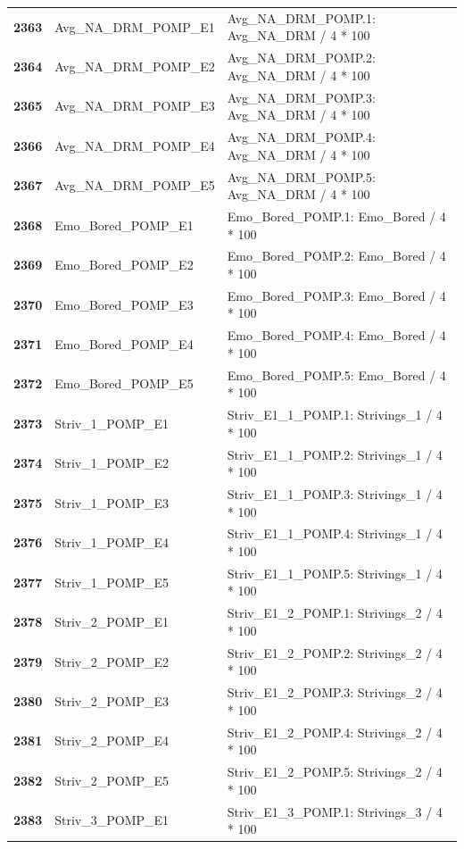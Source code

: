 \documentclass[
  letterpaper,
  DIV=11,
  numbers=noendperiod]{scrartcl}
\begin{document}
\begin{longtable}[t]{>{}cll}
\textbf{2363} & Avg\_NA\_DRM\_POMP\_E1 & Avg\_NA\_DRM\_POMP.1: Avg\_NA\_DRM / 4 * 100\\
\textbf{2364} & Avg\_NA\_DRM\_POMP\_E2 & Avg\_NA\_DRM\_POMP.2: Avg\_NA\_DRM / 4 * 100\\
\textbf{2365} & Avg\_NA\_DRM\_POMP\_E3 & Avg\_NA\_DRM\_POMP.3: Avg\_NA\_DRM / 4 * 100\\
\addlinespace
\textbf{2366} & Avg\_NA\_DRM\_POMP\_E4 & Avg\_NA\_DRM\_POMP.4: Avg\_NA\_DRM / 4 * 100\\
\textbf{2367} & Avg\_NA\_DRM\_POMP\_E5 & Avg\_NA\_DRM\_POMP.5: Avg\_NA\_DRM / 4 * 100\\
\textbf{2368} & Emo\_Bored\_POMP\_E1 & Emo\_Bored\_POMP.1: Emo\_Bored / 4 * 100\\
\textbf{2369} & Emo\_Bored\_POMP\_E2 & Emo\_Bored\_POMP.2: Emo\_Bored / 4 * 100\\
\textbf{2370} & Emo\_Bored\_POMP\_E3 & Emo\_Bored\_POMP.3: Emo\_Bored / 4 * 100\\
\addlinespace
\textbf{2371} & Emo\_Bored\_POMP\_E4 & Emo\_Bored\_POMP.4: Emo\_Bored / 4 * 100\\
\textbf{2372} & Emo\_Bored\_POMP\_E5 & Emo\_Bored\_POMP.5: Emo\_Bored / 4 * 100\\
\textbf{2373} & Striv\_1\_POMP\_E1 & Striv\_E1\_1\_POMP.1: Strivings\_1 / 4 * 100\\
\textbf{2374} & Striv\_1\_POMP\_E2 & Striv\_E1\_1\_POMP.2: Strivings\_1 / 4 * 100\\
\textbf{2375} & Striv\_1\_POMP\_E3 & Striv\_E1\_1\_POMP.3: Strivings\_1 / 4 * 100\\
\addlinespace
\textbf{2376} & Striv\_1\_POMP\_E4 & Striv\_E1\_1\_POMP.4: Strivings\_1 / 4 * 100\\
\textbf{2377} & Striv\_1\_POMP\_E5 & Striv\_E1\_1\_POMP.5: Strivings\_1 / 4 * 100\\
\textbf{2378} & Striv\_2\_POMP\_E1 & Striv\_E1\_2\_POMP.1: Strivings\_2 / 4 * 100\\
\textbf{2379} & Striv\_2\_POMP\_E2 & Striv\_E1\_2\_POMP.2: Strivings\_2 / 4 * 100\\
\textbf{2380} & Striv\_2\_POMP\_E3 & Striv\_E1\_2\_POMP.3: Strivings\_2 / 4 * 100\\
\addlinespace
\textbf{2381} & Striv\_2\_POMP\_E4 & Striv\_E1\_2\_POMP.4: Strivings\_2 / 4 * 100\\
\textbf{2382} & Striv\_2\_POMP\_E5 & Striv\_E1\_2\_POMP.5: Strivings\_2 / 4 * 100\\
\textbf{2383} & Striv\_3\_POMP\_E1 & Striv\_E1\_3\_POMP.1: Strivings\_3 / 4 * 100\\

\end{longtable}
\end{document}
